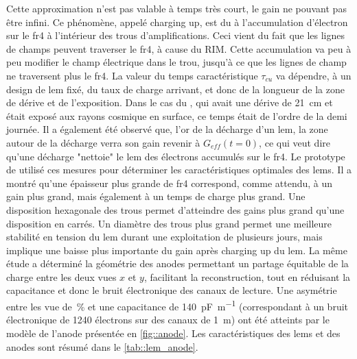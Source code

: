      Cette approximation n'est pas valable à temps très court, le gain ne pouvant pas être infini. Ce phénomène, appelé charging up, est du à l'accumulation d'électron sur le \gls{fr4} à l'intérieur des trous d'amplifications. Ceci vient du fait que les lignes de champs peuvent traverser le \gls{fr4}, à cause du RIM. Cette accumulation va peu à peu modifier le champ électrique dans le trou, jusqu'à ce que les lignes de champ ne traversent plus le \gls{fr4}. La valeur du temps caractéristique $\tau_{cu}$ va dépendre, à un design de \gls{lem} fixé, du taux de charge arrivant, et donc de la longueur de la zone de dérive et de l'exposition. Dans le cas du \threeL{}, qui avait une dérive de \SI{21}{\centi\meter} et était exposé aux rayons cosmique en surface, ce temps était de l'ordre de la demi journée. Il a également été observé que, l'or de la décharge d'un \gls{lem}, la zone autour de la décharge verra son gain revenir à $G_{eff}(t=0)$, ce qui veut dire qu'une décharge "nettoie" le \gls{lem} des électrons accumulés sur le \gls{fr4}. Le prototype de \threeL{} utilisé ces mesures pour déterminer les caractéristiques optimales des \glspl{lem}. Il a montré qu'une épaisseur plus grande de \gls{fr4} correspond, comme attendu, à un gain plus grand, mais également à un temps de charge plus grand. Une disposition hexagonale des trous permet d'atteindre des gains plus grand qu'une disposition en carrés. Un diamètre des trous plus grand permet une meilleure stabilité en tension du \gls{lem} durant une exploitation de plusieurs jours, mais implique une baisse plus importante du gain après charging up du \gls{lem}. La même étude a déterminé la géométrie des anodes permettant un partage équitable de la charge entre les deux vues $x$ et $y$, facilitant la reconstruction, tout en réduisant la capacitance et donc le bruit électronique des canaux de lecture. Une asymétrie entre les vue de \,\% et une capacitance de \SI{140}{\pico\farad\per\meter} (correspondant à un bruit électronique de 1240 électrons sur des canaux de \SI{1}{\meter}) ont été atteints par le modèle de l'anode présentée en \autoref{fig::anode}. Les caractéristiques des \glspl{lem} et des anodes sont résumé dans le \autoref{tab::lem_anode}.

